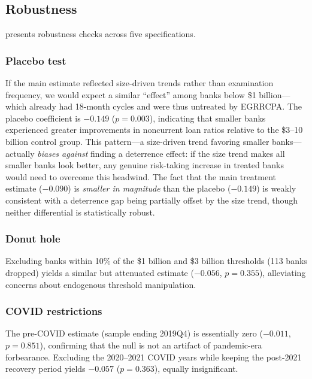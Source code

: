 \documentclass[12pt]{article}
\begin{document}


\subsection{Robustness}

 presents robustness checks across five specifications.

\subsubsection*{Placebo test} If the main estimate reflected size-driven trends rather than examination frequency, we would expect a similar ``effect'' among banks below \$1 billion---which already had 18-month cycles and were thus untreated by EGRRCPA. The placebo coefficient is $-0.149$ ($p = 0.003$), indicating that smaller banks experienced greater improvements in noncurrent loan ratios relative to the \$3--10 billion control group. This pattern---a size-driven trend favoring smaller banks---actually \textit{biases against} finding a deterrence effect: if the size trend makes all smaller banks look better, any genuine risk-taking increase in treated banks would need to overcome this headwind. The fact that the main treatment estimate ($-0.090$) is \textit{smaller in magnitude} than the placebo ($-0.149$) is weakly consistent with a deterrence gap being partially offset by the size trend, though neither differential is statistically robust.

\subsubsection*{Donut hole} Excluding banks within 10\% of the \$1 billion and \$3 billion thresholds (113 banks dropped) yields a similar but attenuated estimate ($-0.056$, $p = 0.355$), alleviating concerns about endogenous threshold manipulation.

\subsubsection*{COVID restrictions} The pre-COVID estimate (sample ending 2019Q4) is essentially zero ($-0.011$, $p = 0.851$), confirming that the null is not an artifact of pandemic-era forbearance. Excluding the 2020--2021 COVID years while keeping the post-2021 recovery period yields $-0.057$ ($p = 0.363$), equally insignificant.


\end{document}
